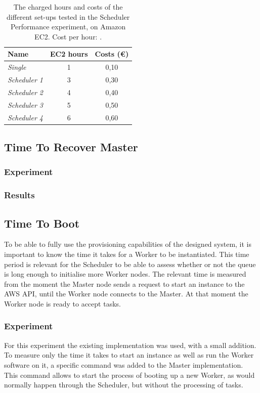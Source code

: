 \documentclass{acm_proc_article-sp}
\begin{document}
\begin{table}
	\centering
	\begin{tabular}{| l | c | c |}
		\hline
		Name & EC2 hours & Costs (\euro) \\ \hline \hline
		\emph{Single} & 1 & 0,10 \\ \hline
		\emph{Scheduler 1} & 3 & 0,30 \\ \hline
		\emph{Scheduler 2} & 4 & 0,40 \\ \hline
		\emph{Scheduler 3} & 5 & 0,50 \\ \hline
		\emph{Scheduler 4} & 6 & 0,60 \\ \hline
	\end{tabular}
	\caption{The charged hours and costs of the different set-ups tested in the Scheduler Performance experiment, on Amazon EC2. Cost per hour: .}
	\label{tbl:costs}
\end{table}

\subsection{Time To Recover Master}

\subsubsection{Experiment}

\subsubsection{Results}

\subsection{Time To Boot}
To be able to fully use the provisioning capabilities of the designed system, it is important to know the time it takes for a Worker to be instantiated.
This time period is relevant for the Scheduler to be able to assess whether or not the queue is long enough to initialise more Worker nodes.
The relevant time is measured from the moment the Master node sends a request to start an instance to the AWS API, until the Worker node connects to the Master.
At that moment the Worker node is ready to accept tasks.

\subsubsection{Experiment}
For this experiment the existing implementation was used, with a small addition.
To measure only the time it takes to start an instance as well as run the Worker software on it, a specific command was added to the Master implementation.
This command allows to start the process of booting up a new Worker, as would normally happen through the Scheduler, but without the processing of tasks.
\end{document}
